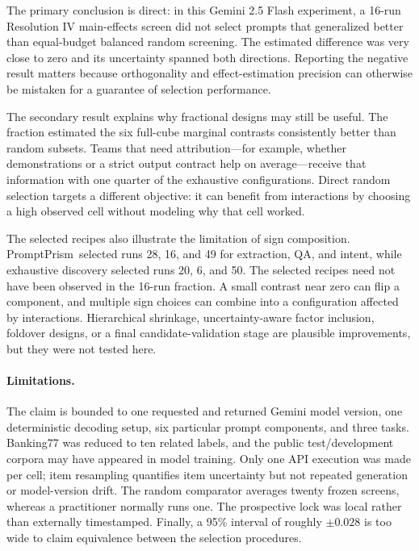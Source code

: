 \documentclass[11pt,a4paper]{article}
\newcommand{\method}{PromptPrism}
\begin{document}
The primary conclusion is direct: in this Gemini 2.5 Flash experiment, a 16-run Resolution IV main-effects screen did not select prompts that generalized better than equal-budget balanced random screening. The estimated difference was very close to zero and its uncertainty spanned both directions. Reporting the negative result matters because orthogonality and effect-estimation precision can otherwise be mistaken for a guarantee of selection performance.

The secondary result explains why fractional designs may still be useful. The fraction estimated the six full-cube marginal contrasts consistently better than random subsets. Teams that need attribution---for example, whether demonstrations or a strict output contract help on average---receive that information with one quarter of the exhaustive configurations. Direct random selection targets a different objective: it can benefit from interactions by choosing a high observed cell without modeling why that cell worked.

The selected recipes also illustrate the limitation of sign composition. \method\ selected runs 28, 16, and 49 for extraction, QA, and intent, while exhaustive discovery selected runs 20, 6, and 50. The selected recipes need not have been observed in the 16-run fraction. A small contrast near zero can flip a component, and multiple sign choices can combine into a configuration affected by interactions. Hierarchical shrinkage, uncertainty-aware factor inclusion, foldover designs, or a final candidate-validation stage are plausible improvements, but they were not tested here.

\paragraph{Limitations.}
The claim is bounded to one requested and returned Gemini model version, one deterministic decoding setup, six particular prompt components, and three tasks. Banking77 was reduced to ten related labels, and the public test/development corpora may have appeared in model training. Only one API execution was made per cell; item resampling quantifies item uncertainty but not repeated generation or model-version drift. The random comparator averages twenty frozen screens, whereas a practitioner normally runs one. The prospective lock was local rather than externally timestamped. Finally, a 95\% interval of roughly $\pm0.028$ is too wide to claim equivalence between the selection procedures.
\end{document}
